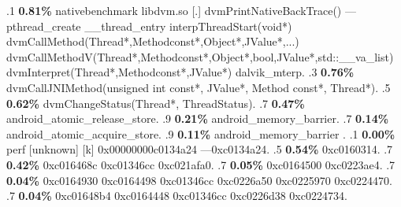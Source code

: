 \begin{profile}
{.1 \textbf{ 0.81\%} nativebenchmark  libdvm.so              [.] dvmPrintNativeBackTrace()\newline {} ---pthread\_create\newline {} \_\_thread\_entry\newline {} interpThreadStart(void*)\newline {} dvmCallMethod(Thread*,Methodconst*,Object*,JValue*,...)\newline {} dvmCallMethodV(Thread*,Methodconst*,Object*,bool,JValue*,std::\_\_va\_list)\newline {} dvmInterpret(Thread*,Methodconst*,JValue*)\newline {} dalvik\_mterp. 
.3 \textbf{0.76\%} dvmCallJNIMethod(unsigned int const*, JValue*, Method const*, Thread*). 
.5 \textbf{0.62\%} dvmChangeStatus(Thread*, ThreadStatus). 
.7 \textbf{0.47\%} android\_atomic\_release\_store. 
.9 \textbf{0.21\%} android\_memory\_barrier. 
.7 \textbf{0.14\%} android\_atomic\_acquire\_store. 
.9 \textbf{0.11\%} android\_memory\_barrier\newline {} . 
.1 \textbf{ 0.00\%} perf             [unknown]              [k] 0x00000000c0134a24\newline {} ---0xc0134a24. 
.5 \textbf{0.54\%} 0xc0160314. 
.7 \textbf{0.42\%} 0xc016468c\newline {} 0xc01346cc\newline {} 0xc021afa0. 
.7 \textbf{0.05\%} 0xc0164500\newline {} 0xc0223ae4. 
.7 \textbf{0.04\%} 0xc0164930\newline {} 0xc0164498\newline {} 0xc01346cc\newline {} 0xc0226a50\newline {} 0xc0225970\newline {} 0xc0224470. 
.7 \textbf{0.04\%} 0xc01648b4\newline {} 0xc0164448\newline {} 0xc01346cc\newline {} 0xc0226d38\newline {} 0xc0224734. 
}
\end{profile}
